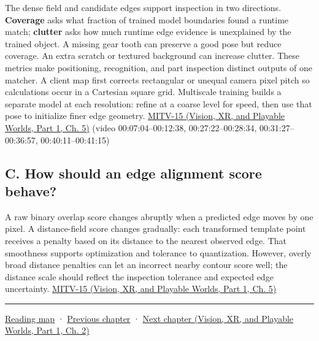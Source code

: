 The dense field and candidate edges support inspection in two directions. \textbf{Coverage} asks what fraction of trained model boundaries found a runtime match; \textbf{clutter} asks how much runtime edge evidence is unexplained by the trained object. A missing gear tooth can preserve a good pose but reduce coverage. An extra scratch or textured background can increase clutter. These metrics make positioning, recognition, and part inspection distinct outputs of one matcher. A client map first corrects rectangular or unequal camera pixel pitch so calculations occur in a Cartesian square grid. Multiscale training builds a separate model at each resolution: refine at a coarse level for speed, then use that pose to initialize finer edge geometry. \href{../07-Vision-XR-and-Playable-Worlds-P01/main.pdf\#nameddest=04-visual-computing-ii-ch036-mitv-15---alignment-patmax-distance-field-filtering-and-sub-sampling-us-7065262}{MITV-15 (Vision, XR, and Playable Worlds, Part 1, Ch. 5)} (video 00:07:04--00:12:38, 00:27:22--00:28:34, 00:31:27--00:36:57, 00:40:11--00:41:15)

\subsection{C. How should an edge alignment score behave?}\label{04-visual-computing-ii-ch030-c.-how-should-an-edge-alignment-score-behave}

\hypertarget{04-visual-computing-ii-ch030-c.-how-should-an-edge-alignment-score-behave}{}

A raw binary overlap score changes abruptly when a predicted edge moves by one pixel. A distance-field score changes gradually: each transformed template point receives a penalty based on its distance to the nearest observed edge. That smoothness supports optimization and tolerance to quantization. However, overly broad distance penalties can let an incorrect nearby contour score well; the distance scale should reflect the inspection tolerance and expected edge uncertainty. \href{../07-Vision-XR-and-Playable-Worlds-P01/main.pdf\#nameddest=04-visual-computing-ii-ch036-mitv-15---alignment-patmax-distance-field-filtering-and-sub-sampling-us-7065262}{MITV-15 (Vision, XR, and Playable Worlds, Part 1, Ch. 5)}

\begin{center}\rule{0.5\linewidth}{0.5pt}\end{center}

\hyperref[volume-reading-map]{Reading map} · \hyperref[04-visual-computing-ii-ch029-acceleration-structures-and-robust-queries]{Previous chapter} · \href{../07-Vision-XR-and-Playable-Worlds-P01/main.pdf\#nameddest=04-visual-computing-ii-ch031-learning-a-visual-classifier}{Next chapter (Vision, XR, and Playable Worlds, Part 1, Ch. 2)}
